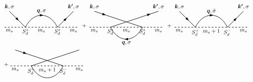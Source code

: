 \documentclass[aps,prx,superscriptaddress,onecolumn,preprintnumbers,nofootinbib,longbibliography]{revtex4-1}
\def\arrow{\tikz[scale=0.1,baseline=.1ex]{
	\draw[fill=black,rotate=-90] (-0.7,0)--(0,2)--(0.7,0);}
	}
\begin{document}
		\begin{align}
			&\begin{tikzpicture}[baseline]
				\draw[thick,dashed] (-2.3,0)--(2.3,0);
				\draw[thick] (-2,1)--(-1,0) .. controls (-0.5,1) and (0.5,1) ..(1,0)--(2,1);
				\node[below] at (2,0) {$m_s$};
				\node[below] at (-2,0) {$m_s$};
				\node[below] at (0,0) {$m_s$};
				\node[below] at (1,0) {$S_d^z$};
				\node[below] at (-1,0) {$S_d^z$};
				\node[rotate=-45] at (-1.5,0.5) {\arrow};
				\node at (0,0.75) {\arrow};
				\node at (0,1) {$\bm{q},\sigma$};
				\node[above] at (-2,1) {$\bm{k},\sigma$};
				\node[above] at (2,1) {$\bm{k'},\sigma$};
				\node[rotate=45] at (1.5,0.5) {\arrow};
			\end{tikzpicture}+
			\begin{tikzpicture}[baseline]
				\draw[thick,dashed] (-2.3,0)--(2.3,0);
				\draw[thick] (-2,1)--(1,0) .. controls (0.5,-1) and (-0.5,-1) .. (-1,0)--(2,1);
				\node[below] at (2,0) {$m_s$};
				\node[below] at (-2,0) {$m_s$};
				\node[below] at (0,0) {$m_s$};
				\node[below] at (1,0) {$S_d^z$};
				\node[below] at (-1,0) {$S_d^z$};
				\node[rotate=-20] at (-1.4,0.8) {\arrow};
				\node[rotate=180] at (0,-0.75) {\arrow};
				\node at (0,-1) {$\bm{q},\sigma$};
				\node[above] at (-2,1) {$\bm{k},\sigma$};
				\node[above] at (2,1) {$\bm{k'},\sigma$};
				\node[rotate=20] at (1.4,0.8) {\arrow};
			\end{tikzpicture}+
			\begin{tikzpicture}[baseline]
				\draw[thick,dashed] (-2.3,0)--(2.3,0);
				\draw[thick] (-2,1)--(-1,0) .. controls (-0.5,1) and (0.5,1) ..(1,0)--(2,1);
				\node[below] at (-2,0) {$m_s$};
				\node[below] at (0,0) {$m_s+1$};
				\node[below] at (2,0) {$m_s$};
				\node[below] at (1,0) {$S_d^-$};
				\node[below] at (-1,0) {$S_d^+$};
				\node[rotate=-45] at (-1.5,0.5) {\arrow};
				\node at (0,0.75) {\arrow};
				\node at (0,1) {$\bm{q},\bar{\sigma}$};
				\node[above] at (-2,1) {$\bm{k},\sigma$};
				\node[above] at (2,1) {$\bm{k'},\sigma$};
				\node[rotate=45] at (1.5,0.5) {\arrow};
			\end{tikzpicture}\nonumber\\
			&+\begin{tikzpicture}[baseline]
				\draw[thick,dashed] (-2.3,0)--(2.3,0);
				\draw[thick] (-2,1)--(1,0) .. controls (0.5,-1) and (-0.5,-1) .. (-1,0)--(2,1);
				\node[below] at (-2,0) {$m_s$};
				\node[below] at (0,0) {$m_s+1$};
				\node[below] at (2,0) {$m_s$};
				\node[below] at (1,0) {$S_d^-$};
				\node[below] at (-1,0) {$S_d^+$};
				\node[rotate=-20] at (-1.4,0.8) {\arrow};

\end{tikzpicture}
\end{align}
\end{document}
